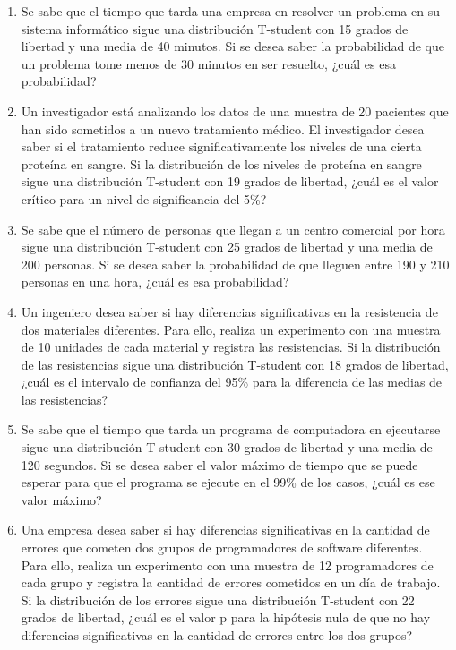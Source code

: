 \begin{Ejer}
\begin{enumerate}
\item Se sabe que el tiempo que tarda una empresa en resolver un problema en su sistema inform\'atico sigue una distribuci\'on T-student con 15 grados de libertad y una media de 40 minutos. Si se desea saber la probabilidad de que un problema tome menos de 30 minutos en ser resuelto, ¿cu\'al es esa probabilidad?

\item Un investigador est\'a analizando los datos de una muestra de 20 pacientes que han sido sometidos a un nuevo tratamiento m\'edico. El investigador desea saber si el tratamiento reduce significativamente los niveles de una cierta prote\'ina en sangre. Si la distribuci\'on de los niveles de prote\'ina en sangre sigue una distribuci\'on T-student con 19 grados de libertad, ¿cu\'al es el valor cr\'itico para un nivel de significancia del 5\%?

\item Se sabe que el n\'umero de personas que llegan a un centro comercial por hora sigue una distribuci\'on T-student con 25 grados de libertad y una media de 200 personas. Si se desea saber la probabilidad de que lleguen entre 190 y 210 personas en una hora, ¿cu\'al es esa probabilidad?

\item Un ingeniero desea saber si hay diferencias significativas en la resistencia de dos materiales diferentes. Para ello, realiza un experimento con una muestra de 10 unidades de cada material y registra las resistencias. Si la distribuci\'on de las resistencias sigue una distribuci\'on T-student con 18 grados de libertad, ¿cu\'al es el intervalo de confianza del 95\% para la diferencia de las medias de las resistencias?

\item Se sabe que el tiempo que tarda un programa de computadora en ejecutarse sigue una distribuci\'on T-student con 30 grados de libertad y una media de 120 segundos. Si se desea saber el valor m\'aximo de tiempo que se puede esperar para que el programa se ejecute en el 99\% de los casos, ¿cu\'al es ese valor m\'aximo?

\item Una empresa desea saber si hay diferencias significativas en la cantidad de errores que cometen dos grupos de programadores de software diferentes. Para ello, realiza un experimento con una muestra de 12 programadores de cada grupo y registra la cantidad de errores cometidos en un d\'ia de trabajo. Si la distribuci\'on de los errores sigue una distribuci\'on T-student con 22 grados de libertad, ¿cu\'al es el valor p para la hip\'otesis nula de que no hay diferencias significativas en la cantidad de errores entre los dos grupos?


\end{enumerate}
\end{Ejer}

